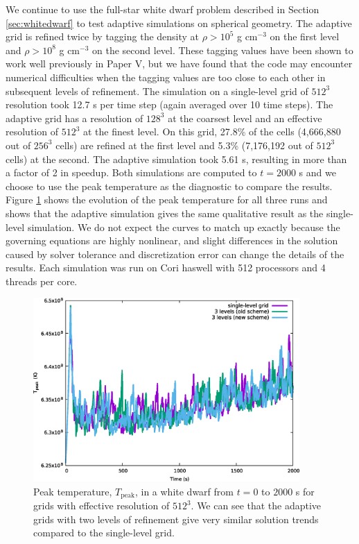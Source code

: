 \documentclass{aastex62}
\begin{document}
We continue to use the full-star white dwarf problem described in Section \ref{sec:whitedwarf} to test adaptive simulations on spherical geometry. The adaptive grid is refined twice by tagging the density at $\rho > 10^5$ g cm$^{-3}$ on the first level and $\rho > 10^8$ g cm$^{-3}$ on the second level. These tagging values have been shown to work well previously in Paper V, but we have found that the code may encounter numerical difficulties when the tagging values are too close to each other in subsequent levels of refinement.
The simulation on a single-level grid of $512^3$ resolution took 12.7 s per time step (again averaged over 10 time steps).  The adaptive grid has a resolution of $128^3$ at the coarsest level and an effective resolution of $512^3$ at the finest level. On this grid, 27.8\% of the cells (4,666,880 out of $256^3$ cells) are refined at the first level and 5.3\% (7,176,192 out of $512^3$ cells) at the second. The adaptive simulation took 5.61 s, resulting in more than a factor of 2 in speedup. Both simulations are computed to $t=2000$ s and we choose to use the peak temperature as the diagnostic to compare the results. Figure \ref{fig:wdconvect_amr_Tmax} shows the evolution of the peak temperature for all three runs and shows that the adaptive simulation gives the same qualitative result as the single-level simulation. We do not expect the curves to match up exactly because the governing equations are highly nonlinear, and slight differences in the solution caused by solver tolerance and discretization error can change the details of the results. Each simulation was run on Cori haswell with 512 processors and 4 threads per core.

\begin{figure}[htb]
\begin{center}
\includegraphics[width=4.0in]{wdconvect_amr_Tmax.eps}
\caption{\label{fig:wdconvect_amr_Tmax} Peak temperature, $T_{\text{peak}}$, in a white dwarf from $t=0$ to $2000$ s
         for grids with effective resolution of $512^3$. We can see that the adaptive grids with two levels of
         refinement give very similar solution trends compared to the single-level grid.}
\end{center}
\end{figure}
\end{document}
